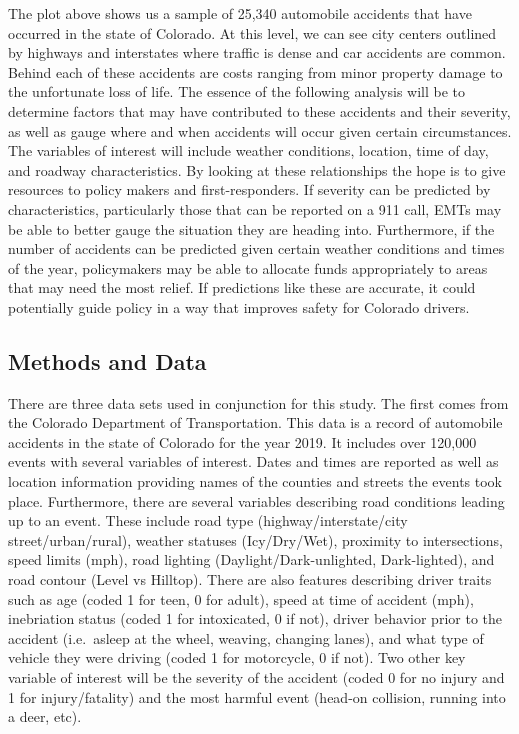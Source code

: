 \documentclass[
]{article}
\begin{document}
The plot above shows us a sample of 25,340 automobile accidents that
have occurred in the state of Colorado. At this level, we can see city
centers outlined by highways and interstates where traffic is dense and
car accidents are common. Behind each of these accidents are costs
ranging from minor property damage to the unfortunate loss of life. The
essence of the following analysis will be to determine factors that may
have contributed to these accidents and their severity, as well as gauge
where and when accidents will occur given certain circumstances. The
variables of interest will include weather conditions, location, time of
day, and roadway characteristics. By looking at these relationships the
hope is to give resources to policy makers and first-responders. If
severity can be predicted by characteristics, particularly those that
can be reported on a 911 call, EMTs may be able to better gauge the
situation they are heading into. Furthermore, if the number of accidents
can be predicted given certain weather conditions and times of the year,
policymakers may be able to allocate funds appropriately to areas that
may need the most relief. If predictions like these are accurate, it
could potentially guide policy in a way that improves safety for
Colorado drivers.

\hypertarget{methods-and-data}{%
\subsection{Methods and Data}\label{methods-and-data}}

There are three data sets used in conjunction for this study. The first
comes from the Colorado Department of Transportation. This data is a
record of automobile accidents in the state of Colorado for the year
2019. It includes over 120,000 events with several variables of
interest. Dates and times are reported as well as location information
providing names of the counties and streets the events took place.
Furthermore, there are several variables describing road conditions
leading up to an event. These include road type (highway/interstate/city
street/urban/rural), weather statuses (Icy/Dry/Wet), proximity to
intersections, speed limits (mph), road lighting
(Daylight/Dark-unlighted, Dark-lighted), and road contour (Level vs
Hilltop). There are also features describing driver traits such as age
(coded 1 for teen, 0 for adult), speed at time of accident (mph),
inebriation status (coded 1 for intoxicated, 0 if not), driver behavior
prior to the accident (i.e.~asleep at the wheel, weaving, changing
lanes), and what type of vehicle they were driving (coded 1 for
motorcycle, 0 if not). Two other key variable of interest will be the
severity of the accident (coded 0 for no injury and 1 for
injury/fatality) and the most harmful event (head-on collision, running
into a deer, etc).
\end{document}
